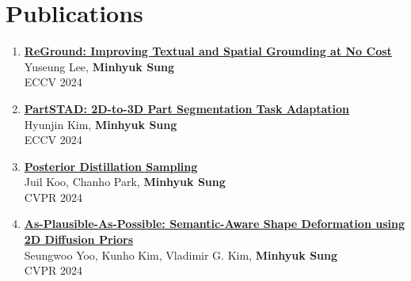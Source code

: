 \documentclass[letterpaper,10pt]{article} %
\newcommand{\blankline}{\quad\pagebreak[2]}
\begin{document}
{%
%
%
%

\newpage



\section{Publications}

\begin{enumerate}

\item \label{eccv24_2}
\href{https://arxiv.org/abs/2403.13589}{\textbf{ReGround: Improving Textual and Spatial Grounding at No Cost}}\\
Yuseung Lee, \textbf{Minhyuk Sung}\\
ECCV 2024\\
\blankline

\item \label{eccv24_1}
\href{https://arxiv.org/abs/2401.05906}{\textbf{PartSTAD: 2D-to-3D Part Segmentation Task Adaptation}}\\
Hyunjin Kim, \textbf{Minhyuk Sung}\\
ECCV 2024\\
\blankline

\item \label{cvpr24_3}
\href{https://arxiv.org/abs/2311.13831}{\textbf{Posterior Distillation Sampling}}\\
Juil Koo, Chanho Park, \textbf{Minhyuk Sung}\\
CVPR 2024\\
\blankline

\item \label{cvpr24_2}
\href{https://arxiv.org/abs/2311.16739}{\textbf{As-Plausible-As-Possible: Semantic-Aware Shape Deformation using 2D Diffusion Priors}}\\
Seungwoo Yoo, Kunho Kim, Vladimir G. Kim, \textbf{Minhyuk Sung}\\
CVPR 2024\\
\blankline


\end{enumerate}}
\end{document}
